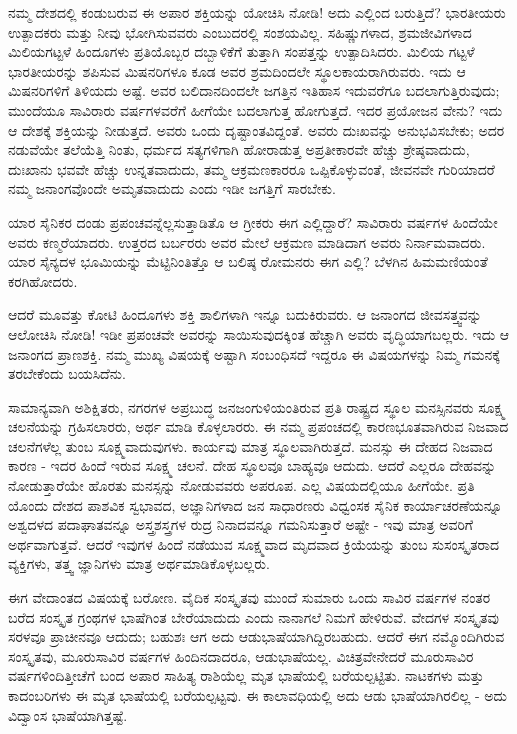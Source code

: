 ನಮ್ಮ ದೇಶದಲ್ಲಿ ಕಂಡುಬರುವ ಈ ಅಪಾರ ಶಕ್ತಿಯನ್ನು ಯೋಚಿಸಿ ನೋಡಿ! ಅದು ಎಲ್ಲಿಂದ ಬರುತ್ತಿದೆ? ಭಾರತೀಯರು ಉತ್ಪಾದಕರು ಮತ್ತು ನೀವು ಭೋಗಿಸುವವರು ಎಂಬುದರಲ್ಲಿ ಸಂಶಯವಿಲ್ಲ. ಸಹಿಷ್ಣುಗಳಾದ, ಶ್ರಮಜೀವಿಗಳಾದ ಮಿಲಿಯಗಟ್ಟಳೆ ಹಿಂದೂಗಳು ಪ್ರತಿಯೊಬ್ಬರ ದಬ್ಬಾಳಿಕೆಗೆ ತುತ್ತಾಗಿ ಸಂಪತ್ತನ್ನು ಉತ್ಪಾದಿಸಿದರು. ಮಿಲಿಯ ಗಟ್ಟಳೆ ಭಾರತೀಯರನ್ನು ಶಪಿಸುವ ಮಿಷನರಿಗಳೂ ಕೂಡ ಅವರ ಶ್ರಮದಿಂದಲೇ ಸ್ಥೂಲಕಾಯರಾಗಿರುವರು. ಇದು ಆ ಮಿಷನರಿಗಳಿಗೆ ತಿಳಿಯದು ಅಷ್ಟೆ. ಅವರ ಬಲಿದಾನದಿಂದಲೇ ಜಗತ್ತಿನ ಇತಿಹಾಸ ಇದುವರೆಗೂ ಬದಲಾಗುತ್ತಿರುವುದು; ಮುಂದೆಯೂ ಸಾವಿರಾರು ವರ್ಷಗಳವರೆಗೆ ಹೀಗೆಯೇ ಬದಲಾಗುತ್ತ ಹೋಗುತ್ತದೆ. ಇದರ ಪ್ರಯೋಜನ ವೇನು? ಇದು ಆ ದೇಶಕ್ಕೆ ಶಕ್ತಿಯನ್ನು ನೀಡುತ್ತದೆ. ಅವರು ಒಂದು ದೃಷ್ಟಾಂತವಿದ್ದಂತೆ. ಅವರು ದುಃಖವನ್ನು ಅನುಭವಿಸಬೇಕು; ಅದರ ನಡುವೆಯೇ ತಲೆಯೆತ್ತಿ ನಿಂತು, ಧರ್ಮದ ಸತ್ಯಗಳಿಗಾಗಿ ಹೋರಾಡುತ್ತ ಅಪ್ರತೀಕಾರವೇ ಹೆಚ್ಚು ಶ್ರೇಷ್ಠವಾದುದು, ದುಃಖಾನು ಭವವೇ ಹೆಚ್ಚು ಉನ್ನತವಾದುದು, ತಮ್ಮ ಆಕ್ರಮಣಕಾರರೂ ಒಪ್ಪಿಕೊಳ್ಳುವಂತೆ, ಜೀವನವೇ ಗುರಿಯಾದರೆ ನಮ್ಮ ಜನಾಂಗವೊಂದೇ ಅಮೃತವಾದುದು ಎಂದು ಇಡೀ ಜಗತ್ತಿಗೆ ಸಾರಬೇಕು.

ಯಾರ ಸೈನಿಕರ ದಂಡು ಪ್ರಪಂಚವನ್ನೆಲ್ಲಸುತ್ತಾಡಿತೊ ಆ ಗ್ರೀಕರು ಈಗ ಎಲ್ಲಿದ್ದಾರೆ? ಸಾವಿರಾರು ವರ್ಷಗಳ ಹಿಂದೆಯೇ ಅವರು ಕಣ್ಮರೆಯಾದರು. ಉತ್ತರದ ಬರ್ಬರರು ಅವರ ಮೇಲೆ ಆಕ್ರಮಣ ಮಾಡಿದಾಗ ಅವರು ನಿರ್ನಾಮವಾದರು. ಯಾರ ಸೈನ್ಯದಳ ಭೂಮಿಯನ್ನು ಮೆಟ್ಟಿನಿಂತಿತ್ತೊ ಆ ಬಲಿಷ್ಠ ರೋಮನರು ಈಗ ಎಲ್ಲಿ? ಬೆಳಗಿನ ಹಿಮಮಣಿಯಂತೆ ಕರಗಿಹೋದರು.

ಆದರೆ ಮೂವತ್ತು ಕೋಟಿ ಹಿಂದೂಗಳು ಶಕ್ತಿ ಶಾಲಿಗಳಾಗಿ ಇನ್ನೂ ಬದುಕಿರುವರು. ಆ ಜನಾಂಗದ ಜೀವಸತ್ತ್ವವನ್ನು ಆಲೋಚಿಸಿ ನೋಡಿ! ಇಡೀ ಪ್ರಪಂಚವೇ ಅವರನ್ನು ಸಾಯಿಸುವುದಕ್ಕಿಂತ ಹೆಚ್ಚಾಗಿ ಅವರು ವೃದ್ಧಿಯಾಗಬಲ್ಲರು. ಇದು ಆ ಜನಾಂಗದ ಪ್ರಾಣಶಕ್ತಿ. ನಮ್ಮ ಮುಖ್ಯ ವಿಷಯಕ್ಕೆ ಅಷ್ಟಾಗಿ ಸಂಬಂಧಿಸದೆ ಇದ್ದರೂ ಈ ವಿಷಯಗಳನ್ನು ನಿಮ್ಮ ಗಮನಕ್ಕೆ ತರಬೇಕೆಂದು ಬಯಸಿದೆನು.

ಸಾಮಾನ್ಯವಾಗಿ ಅಶಿಕ್ಷಿತರು, ನಗರಗಳ ಅಪ್ರಬುದ್ಧ ಜನಜಂಗುಳಿಯಂತಿರುವ ಪ್ರತಿ ರಾಷ್ಟ್ರದ ಸ್ಥೂಲ ಮನಸ್ಸಿನವರು ಸೂಕ್ಷ್ಮ ಚಲನೆಯನ್ನು ಗ್ರಹಿಸಲಾರರು, ಅರ್ಥ ಮಾಡಿ ಕೊಳ್ಳಲಾರರು. ಈ ನಮ್ಮ ಪ್ರಪಂಚದಲ್ಲಿ ಕಾರಣಭೂತವಾಗಿರುವ ನಿಜವಾದ ಚಲನೆಗಳೆಲ್ಲ ತುಂಬ ಸೂಕ್ಷ್ಮವಾದುವುಗಳು. ಕಾರ್ಯವು ಮಾತ್ರ ಸ್ಥೂಲವಾಗಿರುತ್ತದೆ. ಮನಸ್ಸು ಈ ದೇಹದ ನಿಜವಾದ ಕಾರಣ - ಇದರ ಹಿಂದೆ ಇರುವ ಸೂಕ್ಷ್ಮ ಚಲನೆ. ದೇಹ ಸ್ಥೂಲವೂ ಬಾಹ್ಯವೂ ಆದುದು. ಆದರೆ ಎಲ್ಲರೂ ದೇಹವನ್ನು ನೋಡುತ್ತಾರೆಯೇ ಹೊರತು ಮನಸ್ಸನ್ನು ನೋಡುವವರು ಅಪರೂಪ. ಎಲ್ಲ ವಿಷಯದಲ್ಲಿಯೂ ಹೀಗೆಯೇ. ಪ್ರತಿ ಯೊಂದು ದೇಶದ ಪಾಶವಿಕ ಸ್ವಭಾವದ, ಅಜ್ಞಾನಿಗಳಾದ ಜನ ಸಾಧಾರಣರು ವಿಧ್ವಂಸಕ ಸೈನಿಕ ಕಾರ್ಯಾಚರಣೆಯನ್ನೂ ಅಶ್ವದಳದ ಪದಾಘಾತವನ್ನೂ ಅಸ್ತ್ರಶಸ್ತ್ರಗಳ ರುದ್ರ ನಿನಾದವನ್ನೂ ಗಮನಿಸುತ್ತಾರೆ ಅಷ್ಟೇ - ಇವು ಮಾತ್ರ ಅವರಿಗೆ ಅರ್ಥವಾಗುತ್ತವೆ. ಆದರೆ ಇವುಗಳ ಹಿಂದೆ ನಡೆಯುವ ಸೂಕ್ಷ್ಮವಾದ ಮೃದವಾದ ಕ್ರಿಯೆಯನ್ನು ತುಂಬ ಸುಸಂಸ್ಕೃತರಾದ ವ್ಯಕ್ತಿಗಳು, ತತ್ತ್ವ ಜ್ಞಾನಿಗಳು ಮಾತ್ರ ಅರ್ಥಮಾಡಿಕೊಳ್ಳಬಲ್ಲರು.

ಈಗ ವೇದಾಂತದ ವಿಷಯಕ್ಕೆ ಬರೋಣ. ವೈದಿಕ ಸಂಸ್ಕೃತವು ಮುಂದೆ ಸುಮಾರು ಒಂದು ಸಾವಿರ ವರ್ಷಗಳ ನಂತರ ಬರೆದ ಸಂಸ್ಕೃತ ಗ್ರಂಥಗಳ ಭಾಷೆಗಿಂತ ಬೇರೆಯಾದುದು ಎಂದು ನಾನಾಗಲೆ ನಿಮಗೆ ಹೇಳಿರುವೆ. ವೇದಗಳ ಸಂಸ್ಕೃತವು ಸರಳವೂ ಪ್ರಾಚೀನವೂ ಆದುದು; ಬಹುಶಃ ಆಗ ಅದು ಆಡುಭಾಷೆಯಾಗಿದ್ದಿರಬಹುದು. ಆದರೆ ಈಗ ನಮ್ಮೊಂದಿಗಿರುವ ಸಂಸ್ಕೃತವು, ಮೂರುಸಾವಿರ ವರ್ಷಗಳ ಹಿಂದಿನದಾದರೂ, ಆಡುಭಾಷೆಯಲ್ಲ. ವಿಚಿತ್ರವೇನೇದರೆ ಮೂರುಸಾವಿರ ವರ್ಷಗಳಿಂದಿತ್ತೀಚೆಗೆ ಬಂದ ಅಪಾರ ಸಾಹಿತ್ಯ ರಾಶಿಯೆಲ್ಲ ಮೃತ ಭಾಷೆಯಲ್ಲಿ ಬರೆಯಲ್ಪಟ್ಟಿತು. ನಾಟಕಗಳು ಮತ್ತು ಕಾದಂಬರಿಗಳು ಈ ಮೃತ ಭಾಷೆಯಲ್ಲಿ ಬರೆಯಲ್ಪಟ್ಟವು. ಈ ಕಾಲಾವಧಿಯಲ್ಲಿ ಅದು ಆಡು ಭಾಷೆಯಾಗಿರಲಿಲ್ಲ - ಅದು ವಿದ್ವಾಂಸ ಭಾಷೆಯಾಗಿತ್ತಷ್ಟೆ.

